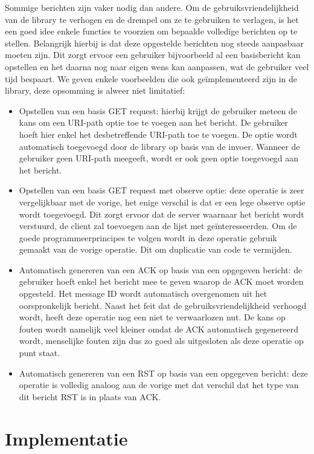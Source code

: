 Sommige berichten zijn vaker nodig dan andere. Om de gebruiksvriendelijkheid van de library te verhogen en de drempel om ze te gebruiken te verlagen, is het een goed idee enkele functies te voorzien om bepaalde volledige berichten op te stellen. Belangrijk hierbij is dat deze opgestelde berichten nog steeds aanpasbaar moeten zijn. Dit zorgt ervoor een gebruiker bijvoorbeeld al een basisbericht kan opstellen en het daarna nog naar eigen wens kan aanpassen, wat de gebruiker veel tijd bespaart. We geven enkele voorbeelden die ook ge\"{i}mplementeerd zijn in de library, deze opsomming is alweer niet limitatief:
\begin{itemize}
\item Opstellen van een basis GET request: hierbij krijgt de gebruiker meteen de kans om een URI-path optie toe te voegen aan het bericht. De gebruiker hoeft hier enkel het desbetreffende URI-path toe te voegen. De optie wordt automatisch toegevoegd door de library op basis van de invoer. Wanneer de gebruiker geen URI-path meegeeft, wordt er ook geen optie toegevoegd aan het bericht.
\item Opstellen van een basis GET request met observe optie: deze operatie is zeer vergelijkbaar met de vorige, het enige verschil is dat er een lege observe optie wordt toegevoegd. Dit zorgt ervoor dat de server waarnaar het bericht wordt verstuurd, de client zal toevoegen aan de lijst met ge\"{i}nteresseerden. Om de goede programmeerprincipes te volgen wordt in deze operatie gebruik gemaakt van de vorige operatie. Dit om duplicatie van code te vermijden.
\item Automatisch genereren van een ACK op basis van een opgegeven bericht: de gebruiker hoeft enkel het bericht mee te geven waarop de ACK moet worden opgesteld. Het message ID wordt automatisch overgenomen uit het oorspronkelijk bericht. Naast het feit dat de gebruiksvriendelijkheid verhoogd wordt, heeft deze operatie nog een niet te verwaarlozen nut. De kans op fouten wordt namelijk veel kleiner omdat de ACK automatisch gegenereerd wordt, menselijke fouten zijn dus zo goed als uitgesloten als deze operatie op punt staat.
\item Automatisch genereren van een RST op basis van een opgegeven bericht: deze operatie is volledig analoog aan de vorige met dat verschil dat het type van dit bericht RST is in plaats van ACK.
\end{itemize}

\section{Implementatie}

